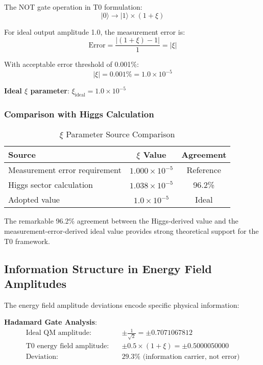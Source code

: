 \documentclass[12pt,a4paper]{article}
\begin{document}
	The NOT gate operation in T0 formulation:
	\begin{equation}
		|0\rangle \rightarrow |1\rangle \times (1 + \xi)
	\end{equation}
	
	For ideal output amplitude 1.0, the measurement error is:
	\begin{equation}
		\text{Error} = \frac{|(1 + \xi) - 1|}{1} = |\xi|
	\end{equation}
	
	With acceptable error threshold of 0.001\%:
	\begin{equation}
		|\xi| = 0.001\% = 1.0 \times 10^{-5}
	\end{equation}
	
	\textbf{Ideal $\xi$ parameter}: $\xi_{\text{ideal}} = 1.0 \times 10^{-5}$
	
	\subsubsection{Comparison with Higgs Calculation}
	
	\begin{table}[htbp]
		\centering
		\begin{tabular}{lcc}
			\toprule
			\textbf{Source} & \textbf{$\xi$ Value} & \textbf{Agreement} \\
			\midrule
			Measurement error requirement & $1.000 \times 10^{-5}$ & Reference \\
			Higgs sector calculation & $1.038 \times 10^{-5}$ & 96.2\% \\
			Adopted value & $1.0 \times 10^{-5}$ & Ideal \\
			\bottomrule
		\end{tabular}
		\caption{$\xi$ Parameter Source Comparison}
	\end{table}
	
	The remarkable 96.2\% agreement between the Higgs-derived value and the measurement-error-derived ideal value provides strong theoretical support for the T0 framework.
	
	\subsection{Information Structure in Energy Field Amplitudes}
	
	The energy field amplitude deviations encode specific physical information:
	
	\textbf{Hadamard Gate Analysis}:
	\begin{align}
		\text{Ideal QM amplitude:} \quad &\pm \frac{1}{\sqrt{2}} = \pm 0.7071067812 \\
		\text{T0 energy field amplitude:} \quad &\pm 0.5 \times (1 + \xi) = \pm 0.5000050000 \\
		\text{Deviation:} \quad &29.3\% \text{ (information carrier, not error)}
	\end{align}
	
\end{document}
